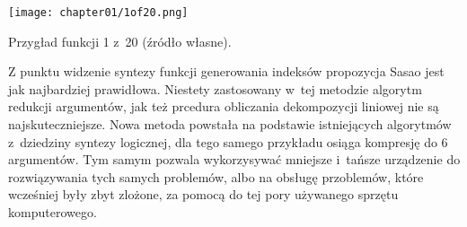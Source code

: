 \begin{table}
\centering
\texttt{[image: chapter01/1of20.png]}
\caption{Przygład funkcji 1 z~20 (źródło własne).}
\label{fig:1of20}
\end{table}

Z punktu widzenie syntezy funkcji generowania indeksów propozycja Sasao jest jak najbardziej prawidłowa.
Niestety zastosowany w~tej metodzie algorytm redukcji argumentów,
jak też prcedura obliczania dekompozycji liniowej nie są najskuteczniejsze.
Nowa metoda powstała na podstawie istniejących algorytmów z~dziedziny syntezy logicznej,
dla tego samego przykładu osiąga kompresję do 6 argumentów.
Tym samym pozwala wykorzysywać mniejsze i~tańsze urządzenie do rozwiązywania tych samych problemów,
albo na obsługę przoblemów, które wcześniej były zbyt zlożone,
za pomocą do tej pory używanego sprzętu komputerowego.






